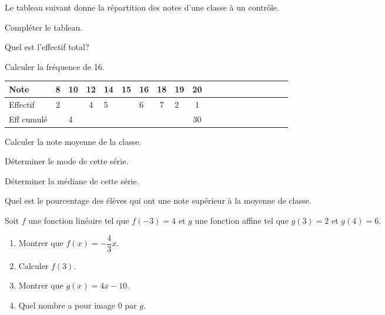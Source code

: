 \documentclass[12pt]{article}
\begin{document}
\devoir[sem=2,prv=true,ds=true,num=6 ,niv=3 ,date=05/05/2023,grp=5]

\begin{exo}[7]
\begin{enumerate}
\begin{EnvFullwidth}
Le tableau suivant donne la répartition des notes d'une classe à un contrôle.
\end{EnvFullwidth}
\begin{minipage}{.42\linewidth}
\item{} Compléter le tableau.
\item{} Quel est l'effectif total?
 \anserline[2]
\item{} Calculer la fréquence   de 16.\anserline[2]
\end{minipage}%
\begin{minipage}{.58\linewidth}
\begin{tabular}{|Oc|Oc|Oc|Oc|Oc|Oc|Oc|Oc|Oc|Oc|}
\hline 
Note & 8 & 10 & 12 & 14 & 15 & 16 & 18 & 19 & 20 \\ 
\hline 
Effectif & 2 &  & 4 & 5 &  & 6 & 7 & 2 & 1 \\ 
\hline 
Eff cumulé &  & 4 &  &  &  &  &  &  & 30 \\ 
\hline 
\end{tabular} 
\end{minipage}%
\item{} Calculer la note moyenne de la classe.\anserline[2]
\item{} Déterminer le mode de cette série.\anserline[1]
\item{} Déterminer la médiane de cette série.\anserline[1]
\item{} Quel est le pourcentage des élèves qui ont une note supérieur à la moyenne de classe.\par\anserline[2]
\end{enumerate}
\end{exo}

\begin{exo}[7]
Soit $f$ une fonction linéaire tel que $f(-3)=4$ et $g$ une fonction affine tel que $g(3)=2$ et $g(4)=6$.
\begin{multicols}{2}
\begin{enumerate}
\item {} Montrer que $f(x)=-\dfrac{4}{3}x$.
\par\anserline[4]
\item Calculer $f(3)$.\par\anserline[3]
\item  Montrer que $g(x)=4x-10$.
\\\anserline[4]
\item {} Quel nombre a pour image 0 par $g$.\\\anserline[3]
\end{enumerate}
\end{multicols}
\end{exo}
\end{document}
